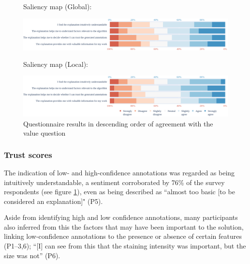 \begin{figure}
\begin{minipage}[c]{0.9\textwidth}
    Saliency map (Global):
    
    \includegraphics[width=\linewidth]{main/Graphics/4ResultsandAnalysis/5_SaliencyMapGlobal.png}
    
    Saliency map (Local):
    
    \includegraphics[width=\linewidth]{main/Graphics/4ResultsandAnalysis/6_SaliencyMapLocal.png}
\end{minipage}
\caption{Questionnaire results in descending order of agreement with the value question} %
\label{fig:results}
\end{figure}

\subsubsection{Trust scores}


The indication of low- and high-confidence annotations was regarded as being intuitively understandable, a sentiment corroborated by 76\% of the survey respondents (see figure \ref{fig:results}), even as being described as ``almost too basic [to be considered an explanation]" (P5). 


Aside from identifying high and low confidence annotations, many participants also inferred from this the factors that may have been important to the solution, linking low-confidence annotations to the presence or absence of certain features (P1--3,6); ``[I] can see from this that the staining intensity was important, but the size was not'' (P6).

